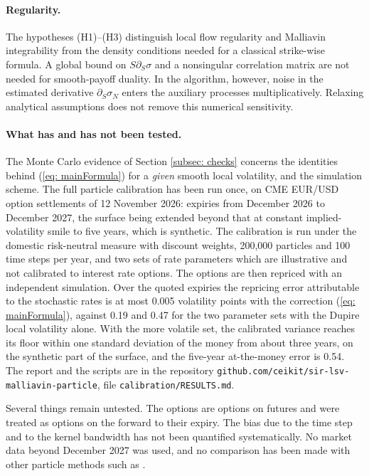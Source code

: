 \paragraph{Regularity.}
The hypotheses (H1)--(H3) distinguish local flow regularity and Malliavin
integrability from the density conditions needed for a classical strike-wise
formula. A global bound on $S\partial_S\sigma$ and a nonsingular correlation
matrix are not needed for smooth-payoff duality. In the algorithm, however,
noise in the estimated derivative $\partial_S\sigma_N$ enters the auxiliary
processes multiplicatively. Relaxing analytical assumptions does not remove
this numerical sensitivity.

\paragraph{What has and has not been tested.} The Monte Carlo evidence of Section \ref{subsec: checks} concerns the identities behind (\ref{eq: mainFormula}) for a \emph{given} smooth local volatility, and the simulation scheme. The full particle calibration has been run once, on CME EUR/USD option settlements of 12 November 2026: expiries from December 2026 to December 2027, the surface being extended beyond that at constant implied-volatility smile to five years, which is synthetic. The calibration is run under the domestic risk-neutral measure with discount weights, 200,000 particles and 100 time steps per year, and two sets of rate parameters which are illustrative and not calibrated to interest rate options. The options are then repriced with an independent simulation. Over the quoted expiries the repricing error attributable to the stochastic rates is at most 0.005 volatility points with the correction (\ref{eq: mainFormula}), against 0.19 and 0.47 for the two parameter sets with the Dupire local volatility alone. With the more volatile set, the calibrated variance reaches its floor within one standard deviation of the money from about three years, on the synthetic part of the surface, and the five-year at-the-money error is 0.54. The report and the scripts are in the repository \texttt{github.com/ceikit/sir-lsv-malliavin-particle}, file \texttt{calibration/RESULTS.md}.

Several things remain untested. The options are options on futures and were treated as options on the forward to their expiry. The bias due to the time step and to the kernel bandwidth has not been quantified systematically. No market data beyond December 2027 was used, and no comparison has been made with other particle methods such as \cite{cozma,ogetbilHientzsch}.

